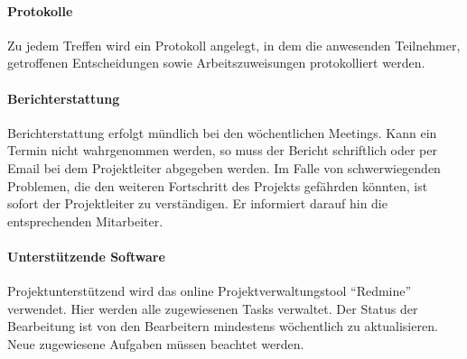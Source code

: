 \paragraph{Protokolle}
Zu jedem Treffen wird ein Protokoll angelegt, in dem die anwesenden Teilnehmer,
getroffenen Entscheidungen sowie Arbeitszuweisungen protokolliert werden.
\paragraph{Berichterstattung}
Berichterstattung erfolgt mündlich bei den wöchentlichen Meetings. Kann ein
Termin nicht wahrgenommen werden, so muss der Bericht schriftlich oder per Email
bei dem Projektleiter abgegeben werden. Im Falle von schwerwiegenden Problemen, die den
weiteren Fortschritt des Projekts gefährden könnten, ist sofort der
Projektleiter zu verständigen. Er informiert darauf hin die entsprechenden Mitarbeiter.
\paragraph{Unterstützende Software}
Projektunterstützend wird das online Projektverwaltungstool "`Redmine"'
verwendet. Hier werden alle zugewiesenen Tasks verwaltet. Der Status der
Bearbeitung ist von den Bearbeitern mindestens wöchentlich zu aktualisieren.
Neue zugewiesene Aufgaben müssen beachtet werden.


